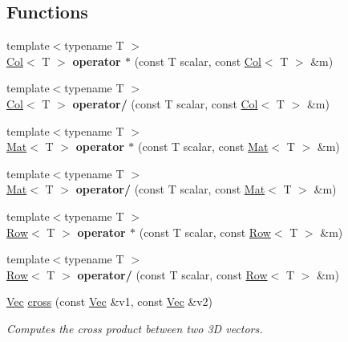 \subsection*{Functions}
\begin{DoxyCompactItemize}
\item 
\mbox{\label{namespacetao_a1883c3bd00846982739b0af933521859}} 
{\footnotesize template$<$typename T $>$ }\\\mbox{\hyperlink{classtao_1_1_col}{Col}}$<$ T $>$ {\bfseries operator $\ast$} (const T scalar, const \mbox{\hyperlink{classtao_1_1_col}{Col}}$<$ T $>$ \&m)
\item 
\mbox{\label{namespacetao_a15f31e477a94ea2195b3cac2025ffe50}} 
{\footnotesize template$<$typename T $>$ }\\\mbox{\hyperlink{classtao_1_1_col}{Col}}$<$ T $>$ {\bfseries operator/} (const T scalar, const \mbox{\hyperlink{classtao_1_1_col}{Col}}$<$ T $>$ \&m)
\item 
\mbox{\label{namespacetao_abe18d9333a0aa68b5fb9535f88f8c7c7}} 
{\footnotesize template$<$typename T $>$ }\\\mbox{\hyperlink{classtao_1_1_mat}{Mat}}$<$ T $>$ {\bfseries operator $\ast$} (const T scalar, const \mbox{\hyperlink{classtao_1_1_mat}{Mat}}$<$ T $>$ \&m)
\item 
\mbox{\label{namespacetao_abf17cac5ef62ed5f9e99d76bea213144}} 
{\footnotesize template$<$typename T $>$ }\\\mbox{\hyperlink{classtao_1_1_mat}{Mat}}$<$ T $>$ {\bfseries operator/} (const T scalar, const \mbox{\hyperlink{classtao_1_1_mat}{Mat}}$<$ T $>$ \&m)
\item 
\mbox{\label{namespacetao_a10fc7c6c01e0a7411896c5d7bae8ea40}} 
{\footnotesize template$<$typename T $>$ }\\\mbox{\hyperlink{classtao_1_1_row}{Row}}$<$ T $>$ {\bfseries operator $\ast$} (const T scalar, const \mbox{\hyperlink{classtao_1_1_row}{Row}}$<$ T $>$ \&m)
\item 
\mbox{\label{namespacetao_a3cf82a9d58ae2cd23dcb3776ea102b96}} 
{\footnotesize template$<$typename T $>$ }\\\mbox{\hyperlink{classtao_1_1_row}{Row}}$<$ T $>$ {\bfseries operator/} (const T scalar, const \mbox{\hyperlink{classtao_1_1_row}{Row}}$<$ T $>$ \&m)
\item 
\mbox{\hyperlink{namespacetao_aef6beca09ab46f269a3189f3027ebc77}{Vec}} \mbox{\hyperlink{namespacetao_aa5a0c330275c16e1b5a6fe994fb0d361}{cross}} (const \mbox{\hyperlink{namespacetao_aef6beca09ab46f269a3189f3027ebc77}{Vec}} \&v1, const \mbox{\hyperlink{namespacetao_aef6beca09ab46f269a3189f3027ebc77}{Vec}} \&v2)
\begin{DoxyCompactList}\small\item\em Computes the cross product between two 3D vectors. \end{DoxyCompactList}\end{DoxyCompactItemize}


